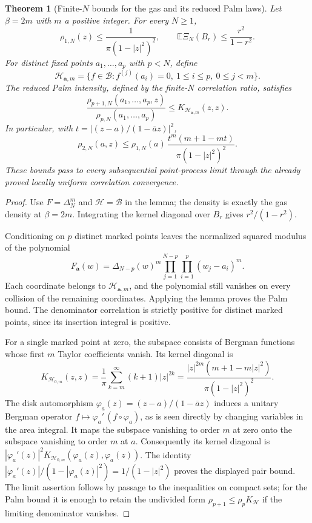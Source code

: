 \documentclass[11pt,a4paper]{article}
\numberwithin{equation}{section}
\newtheorem{theorem}{Theorem}[section]
\theoremstyle{definition}
\theoremstyle{remark}
\begin{document}
\begin{theorem}[Finite-$N$ bounds for the gas and its reduced Palm laws]
\label{thm:even-beta-bergman-bound}
Let $\beta=2m$ with $m$ a positive integer. For every $N\geq1$,
\begin{equation}
 \rho_{1,N}(z)\leq\frac1{\pi(1-|z|^2)^2},\qquad
 \mathbb E\Xi_N(B_r)\leq\frac{r^2}{1-r^2}.
 \label{eq:even-beta-bergman-intensity-count}
\end{equation}
For distinct fixed points $a_1,\ldots,a_p$ with $p<N$, define
\[
 \mathcal H_{\mathbf a,m}
 =\{f\in\mathcal B:f^{(j)}(a_i)=0,
                   \ 1\leq i\leq p,\ 0\leq j<m\}.
\]
The reduced Palm intensity, defined by the finite-$N$ correlation ratio,
satisfies
\begin{equation}
 \frac{\rho_{p+1,N}(a_1,\ldots,a_p,z)}
      {\rho_{p,N}(a_1,\ldots,a_p)}
 \leq K_{\mathcal H_{\mathbf a,m}}(z,z).
 \label{eq:even-beta-palm-bergman-bound}
\end{equation}
In particular, with $t=|(z-a)/(1-\overline a z)|^2$,
\begin{equation}
 \rho_{2,N}(a,z)
 \leq \rho_{1,N}(a)\,
       \frac{t^m(m+1-mt)}{\pi(1-|z|^2)^2}.
 \label{eq:even-beta-pair-bergman-bound}
\end{equation}
These bounds pass to every subsequential point-process limit through
the already proved locally uniform correlation convergence.
\end{theorem}

\begin{proof}
Use $F=\Delta_N^m$ and $\mathcal H=\mathcal B$ in the lemma; the density
is exactly the gas density at $\beta=2m$. Integrating the kernel diagonal
over $B_r$ gives $r^2/(1-r^2)$.

Conditioning on $p$ distinct marked points leaves the normalized squared
modulus of the polynomial
\[
 F_{\mathbf a}(w)
 =\Delta_{N-p}(w)^m
      \prod_{j=1}^{N-p}\prod_{i=1}^p(w_j-a_i)^m.
\]
Each coordinate belongs to $\mathcal H_{\mathbf a,m}$, and the polynomial
still vanishes on every collision of the remaining coordinates.
Applying the lemma proves the Palm bound. The denominator correlation
is strictly positive for distinct marked points, since its insertion
integral is positive.

For a single marked point at zero, the subspace consists of Bergman
functions whose first $m$ Taylor coefficients vanish. Its kernel diagonal is
\[
 K_{\mathcal H_{0,m}}(z,z)
 =\frac1\pi\sum_{k=m}^{\infty}(k+1)|z|^{2k}
 =\frac{|z|^{2m}(m+1-m|z|^2)}{\pi(1-|z|^2)^2}.
\]
The disk automorphism $\varphi_a(z)=(z-a)/(1-\overline a z)$ induces a
unitary Bergman operator $f\mapsto\varphi_a'\,(f\circ\varphi_a)$,
as is seen directly by changing variables in the area integral.
It maps the subspace vanishing to order $m$ at zero onto the subspace
vanishing to order $m$ at $a$. Consequently its kernel diagonal is
$|\varphi_a'(z)|^2K_{\mathcal H_{0,m}}(\varphi_a(z),\varphi_a(z))$.
The identity
$|\varphi_a'(z)|/(1-|\varphi_a(z)|^2)=1/(1-|z|^2)$ proves the displayed
pair bound. The limit assertion follows by passage to the inequalities
on compact sets; for the Palm bound it is enough to retain the
undivided form $\rho_{p+1}\leq\rho_p K_{\mathcal H}$ if the limiting
denominator vanishes.
\end{proof}
\end{document}
